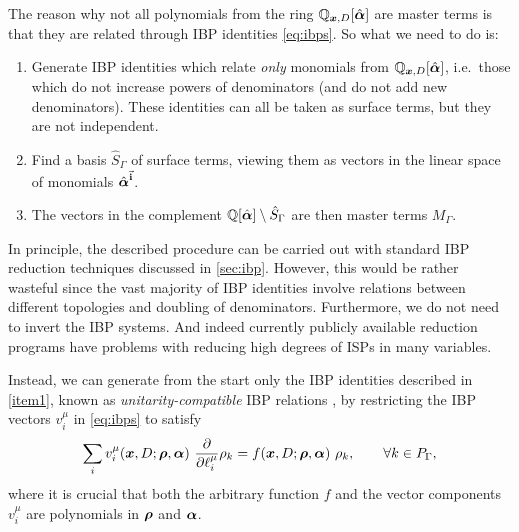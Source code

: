 The reason why not all polynomials from the ring $\mathbb{Q}_{\vb*{x},D}[\hat{\vb*{\alpha}}]$ are master terms is that they are
related through IBP identities \eqref{eq:ibps}. So what we need to do is:
\begin{enumerate}
  \item Generate IBP identities which relate
    \emph{only} monomials from $\mathbb{Q}_{\vb*{x},D}[\hat{\vb*{\alpha}}]$, i.e.\ those which do not increase powers of denominators (and do not add new denominators).
    These identities can all be taken as surface terms, but they are not independent. 
    \label{item1}
  \item  Find a basis $\hat{S}_\Gamma$ of surface terms, viewing them as vectors in the linear space of monomials $\hat{\vb*{\alpha}}^{\va{i}}$.
    \label{item2}
  \item The vectors in the complement $\mathbb{Q}[\hat{\vb*{\alpha}}]\setminus \hat{S}_\Gamma$ are then master terms $M_\Gamma$.
    \label{item3}
\end{enumerate}

In principle, the described procedure can be carried out with standard IBP reduction techniques discussed in \cref{sec:ibp}.
However, this would be rather wasteful
since the vast majority of IBP identities involve relations between different topologies and doubling of denominators.
Furthermore, we do not need to invert the IBP systems.
And indeed currently publicly available reduction programs
\cite{Studerus:2009ye,vonManteuffel:2012np, Smirnov:2008iw,Smirnov:2014hma, Lee:2012cn,Lee:2013mka, Maierhoefer:2017hyi,Maierhofer:2018gpa}
have problems with reducing high degrees of ISPs in many variables.

Instead, we can generate from the start only the IBP identities described in \cref{item1},
known as \emph{unitarity-compatible} IBP relations \cite{Gluza:2010ws,Schabinger:2011dz,Ita:2015tya}, by
restricting the IBP vectors $v_i^\mu$ in \cref{eq:ibps} to satisfy
\begin{equation} \label{eq:non_doubling_ibp_vectors}
  \sum_i v_i^\mu(\vb*{x},D;\vb*{\rho},\vb*{\alpha}) ~ \pdv{\ell^\mu_i} \rho_k = f(\vb*{x},D;\vb*{\rho},\vb*{\alpha}) ~ \rho_k, \qquad \forall k\in P_\Gamma,
\end{equation}
where it is crucial that both the arbitrary function $f$ and the vector components $v_i^\mu$ are polynomials in $\vb*{\rho}$ and $\vb*{\alpha}$.


